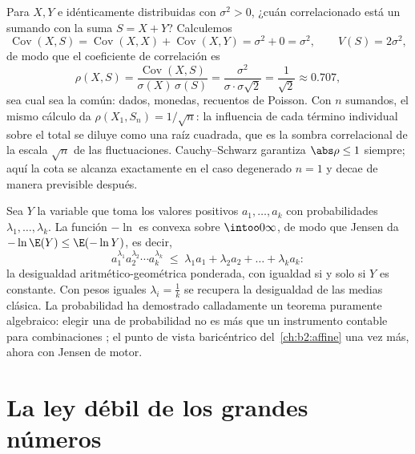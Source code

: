 \begin{example}\label{ex:b2:randomvar:partwhole}
Para $X, Y$  e idénticamente distribuidas con 
$\sigma^2 > 0$, ¿cuán correlacionado está un sumando con la suma $S =
X + Y$? Calculemos
\[
\operatorname{Cov}(X, S) = \operatorname{Cov}(X, X) +
\operatorname{Cov}(X, Y) = \sigma^2 + 0 = \sigma^2,
\qquad V(S) = 2\sigma^2,
\]
de modo que el coeficiente de correlación es
\[
\rho(X, S) = \frac{\operatorname{Cov}(X,
S)}{\sigma(X)\,\sigma(S)}
= \frac{\sigma^2}{\sigma\cdot\sigma\sqrt2}
= \frac{1}{\sqrt2} \approx 0.707 ,
\]
sea cual sea la  común: dados, monedas, recuentos de Poisson. Con
$n$ sumandos, el mismo cálculo da $\rho(X_1, S_n) = 1/\sqrt n$: la
influencia de cada término individual sobre el total se diluye como
una raíz cuadrada, que es la sombra correlacional de la escala
$\sqrt n$ de las fluctuaciones. Cauchy--Schwarz garantiza $\abs\rho
\leq 1$ siempre; aquí la cota se alcanza exactamente en el caso
degenerado $n = 1$ y decae de manera previsible después.
\end{example}

\begin{example}\label{ex:b2:randomvar:amgm}
Sea $Y$ la variable que toma los valores positivos $a_1, \dots, a_k$
con probabilidades $\lambda_1, \dots, \lambda_k$. La función $-\ln$
es convexa sobre $\intoo0\infty$, de modo que Jensen da $-\ln\E(Y)
\leq \E(-\ln Y)$, es decir,
\[
a_1^{\lambda_1}a_2^{\lambda_2}\cdots a_k^{\lambda_k}
\;\leq\; \lambda_1a_1 + \lambda_2a_2 + \dots + \lambda_ka_k :
\]
la desigualdad aritmético-geométrica ponderada, con igualdad si y
solo si $Y$ es constante. Con pesos iguales $\lambda_i = \frac1k$ se
recupera la desigualdad de las medias clásica. La probabilidad ha
demostrado calladamente un teorema puramente algebraico: elegir una
 de probabilidad no es más que un instrumento contable para
combinaciones ; el punto de vista baricéntrico del~\cref{ch:b2:affine} una vez más, ahora con Jensen de motor.
\end{example}

\section{La ley débil de los grandes números}

